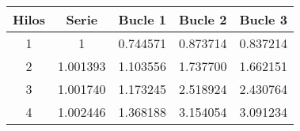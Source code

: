 \begin{tabular}{|c|c|c|c|c|}
\hline \textbf{Hilos} & \textbf{Serie} & \textbf{Bucle 1} & \textbf{Bucle 2} & \textbf{Bucle 3
}\\ 
\hline 1 & 1 & 0.744571 & 0.873714 & 0.837214
\\ 
\hline 2 & 1.001393 & 1.103556 & 1.737700 & 1.662151
\\ 
\hline 3 & 1.001740 & 1.173245 & 2.518924 & 2.430764
\\ 
\hline 4 & 1.002446 & 1.368188 & 3.154054 & 3.091234
\\ 
\hline\end{tabular}